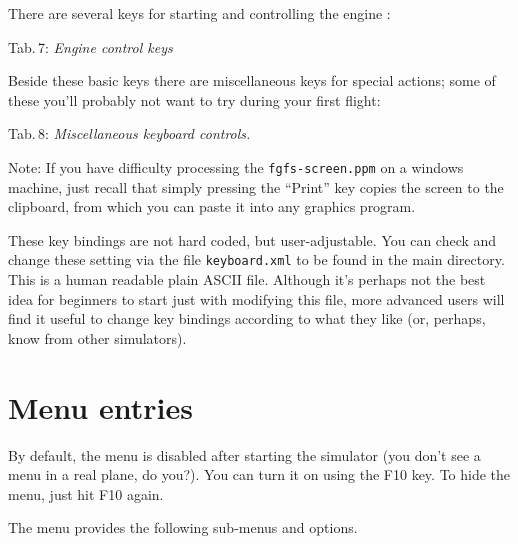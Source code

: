 \centerline{}
\medskip

There are several keys for starting and controlling the engine :

\noindent
 Tab.\,7: \textit{Engine control keys}
\medskip

\centerline{}
\medskip

Beside these basic keys there are miscellaneous keys for special
actions; some of these you'll probably not want to try during your
first flight:
\vfill
\eject

\noindent Tab.\,8: \textit{Miscellaneous keyboard controls.}
\medskip

\centerline{}
\medskip

\noindent
 Note: If you have difficulty processing the 
\texttt{fgfs-screen.ppm}
on a windows machine, just recall that simply pressing the ``Print'' key copies
the
screen to the clipboard, from which you can paste it into any graphics program.

These key bindings are not hard coded, but
user-adjustable.
You can check and change these setting via the file
\texttt{keyboard.xml} to be found in the main
\FlightGear{} directory. This is a human readable plain ASCII file.
Although it's perhaps not the best idea for beginners to start just
with modifying this file, more advanced users will find it useful to
change key bindings according to what they like (or, perhaps, know from
other simulators).

\section{Menu entries}

By default, the menu is disabled after starting the simulator (you
don't see a menu in a real plane, do you?). You can turn it on using the F10
key. 
To hide the menu, just
hit F10 again.

The menu provides the following sub-menus and options.

